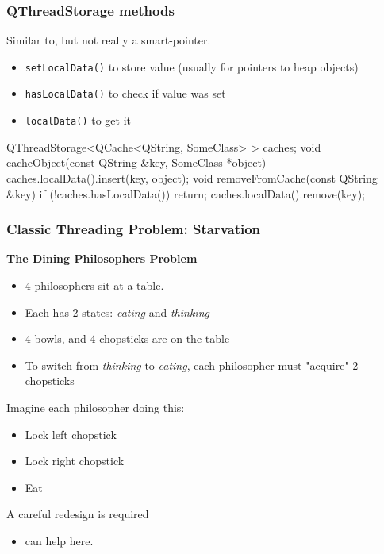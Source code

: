 \begin{slide}[fragile]
\frametitle{QThreadStorage methods}
Similar to, but not really a smart-pointer.
\begin{itemize}
\item \texttt{setLocalData()} to store value (usually for pointers to heap
    objects)
\item \texttt{hasLocalData()} to check if value was set
\item \texttt{localData()} to get it
\end{itemize}
\begin{cpp}
QThreadStorage<QCache<QString, SomeClass> > caches;
void cacheObject(const QString &key, SomeClass *object) {
    caches.localData().insert(key, object);
}
void removeFromCache(const QString &key) {
    if (!caches.hasLocalData())
        return;
    caches.localData().remove(key);
}
\end{cpp}
\end{slide}

\begin{slide}
\frametitle{Classic Threading Problem: Starvation}

\textbf{The Dining Philosophers Problem}
\begin{itemize}
\item 4 philosophers sit at a table.
\item Each has 2 states: \textit{eating} and \textit{thinking}
\item 4 bowls, and 4 chopsticks are on the table
\item To switch from \textit{thinking} to \textit{eating},
      each philosopher must "acquire" 2 chopsticks
\end{itemize}
Imagine each philosopher doing this:
\begin{itemize}
\item  Lock left chopstick
\item  Lock right chopstick
\item  Eat
\end{itemize}

A careful redesign is required
\begin{itemize}
\item {} can help here.
\end{itemize}
\end{slide}


